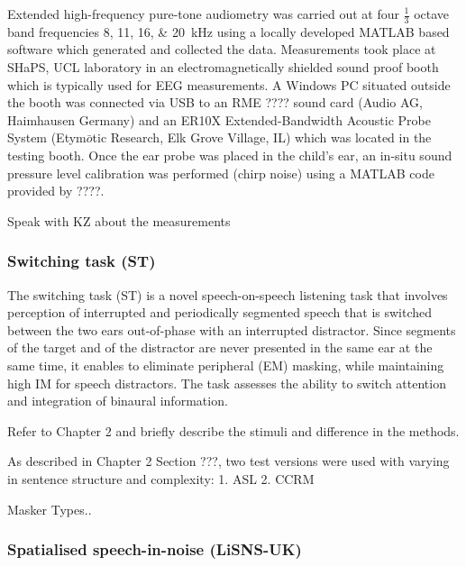 \documentclass[a4paper, twoside]{templates/ociamthesis}
\begin{document}
Extended high-frequency pure-tone audiometry was carried out at four \(\frac{1}{3}\) octave band frequencies 8, 11, 16, \& 20~kHz using a locally developed MATLAB based software which generated and collected the data. Measurements took place at SHaPS, UCL laboratory in an electromagnetically shielded sound proof booth which is typically used for EEG measurements. A Windows PC situated outside the booth was connected via USB to an RME ???? sound card (Audio AG, Haimhausen Germany) and an ER10X Extended-Bandwidth Acoustic Probe System (Etym\(\bar{o}\)tic Research, Elk Grove Village, IL) which was located in the testing booth. Once the ear probe was placed in the child's ear, an in-situ sound pressure level calibration was performed (chirp noise) using a MATLAB code provided by ????.

Speak with KZ about the measurements

\hypertarget{switching-task-st}{%
\subsubsection{Switching task (ST)}\label{switching-task-st}}

The switching task (ST) is a novel speech-on-speech listening task that involves perception of interrupted and periodically segmented speech that is switched between the two ears out-of-phase with an interrupted distractor. Since segments of the target and of the distractor are never presented in the same ear at the same time, it enables to eliminate peripheral (EM) masking, while maintaining high IM for speech distractors. The task assesses the ability to switch attention and integration of binaural information.

Refer to Chapter 2 and briefly describe the stimuli and difference in the methods.

As described in Chapter 2 Section ???, two test versions were used with varying in sentence structure and complexity:
1. ASL
2. CCRM

Masker Types..

\hypertarget{spatialised-speech-in-noise-lisns-uk}{%
\subsubsection{Spatialised speech-in-noise (LiSNS-UK)}\label{spatialised-speech-in-noise-lisns-uk}}
\end{document}
